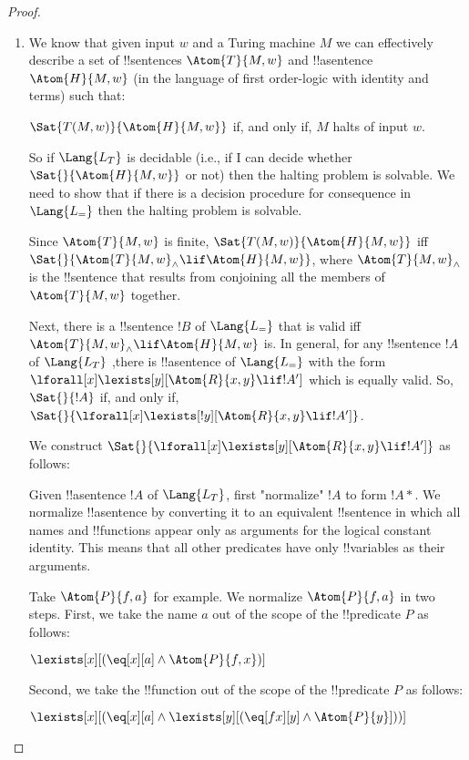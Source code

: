 \documentclass[../../include/open-logic-section]{subfiles}
\begin{document}

\begin{proof}
\begin{enumerate}
\item We know that given input $w$ and a Turing machine $M$ we can
effectively describe a set of !!{sentence}s $\Atom{T}{M,w}$ and
!!a{sentence} $\Atom{H}{M,w}$ (in the
language of first order-logic with identity and terms) such that:

$\Sat{T(M,w)}{\Atom{H}{M,w}}$ if, and only if, $M$ halts of input $w$.

So if $\Lang{L_T}$ is decidable (i.e., if I can decide whether
$\Sat{}{\Atom{H}{M,w}}$ or not) then the halting problem is
solvable. We need to
show that if there is a decision procedure for consequence in $\Lang{L_=}$
then the halting problem is solvable.

Since $\Atom{T}{M,w}$ is finite, $\Sat{T(M,w)}{ \Atom{H}{M,w} }$
iff $\Sat{}{\Atom{T}{M,w}_\land \lif
\Atom{H}{M,w}}$, where $\Atom{T}{M,w}_\land$ is the !!{sentence} that
results from conjoining all
the members of $\Atom{T}{M,w}$ together.

Next, there is a !!{sentence} $!B$ of $\Lang{L_=}$ that is valid iff
$\Atom{T}{M,w}_\land\lif \Atom{H}{M,w}$ is. In general, for any
!!{sentence} $!A$ of $\Lang{L_T}$ ,there is
!!a{sentence} of $\Lang{L_=}$ with the form
$\lforall[x]\lexists[y][\Atom{R}{x,y}\lif !A']$ which is equally valid.
So,$\Sat{}{!A}$ if, and only if,
$\Sat{}{\lforall[x]\lexists[!y][\Atom{R}{x,y}\lif !A']}$.

We construct $\Sat{}{\lforall[x]\lexists[y][\Atom{R}{x,y}\lif !A']}$ as
follows:

Given !!a{sentence} $!A$ of $\Lang{L_T}$, first "normalize" $!A$ to form
$!A*$.
We normalize !!a{sentence} by converting it to an equivalent !!{sentence}
in
which all names and !!{function}s appear only as arguments for the
logical constant identity. This means that all other predicates have
only !!{variable}s as their arguments.

Take $\Atom{P}{f,a}$ for example. We normalize $\Atom{P}{f,a}$ in two
steps. First, we take the name $a$ out of the scope of the !!{predicate}
$P$ as follows:

$\lexists[x][(\eq[x][a] \land \Atom{P}{f,x})]$

Second, we take the !!{function} out of the scope of the
!!{predicate} $P$ as follows:

$\lexists[x][(\eq[x][a] \land \lexists[y][(\eq[fx][y] \land
\Atom{P}{y}]))]$


\end{enumerate}
\end{proof}
\end{document}
